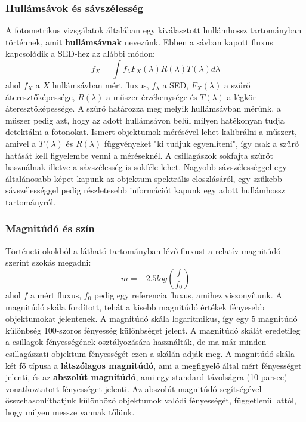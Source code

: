 \documentclass[../main.tex]{subfiles}
\begin{document}
\subsubsection{Hullámsávok és sávszélesség}
A fotometrikus vizsgálatok általában egy kiválasztott hullámhossz tartományban történnek, amit \textbf{hullámsávnak} nevezünk. Ebben a sávban kapott fluxus kapcsolódik a SED-hez az alábbi módon:
\begin{equation}
    f_X = \int f_\lambda F_X(\lambda) R(\lambda) T(\lambda) d\lambda
\end{equation}
ahol $f_X$ a $X$ hullámsávban mért fluxus, $f_\lambda$ a SED, $F_X(\lambda)$ a szűrő áteresztőképessége, $R(\lambda)$ a műszer érzékenysége és $T(\lambda)$ a légkör áteresztőképessége.
A szűrő határozza meg melyik hullámsávban mérünk, a műszer pedig azt, hogy az adott hullámsávon belül milyen hatékonyan tudja detektálni a fotonokat. Ismert objektumok mérésével lehet kalibrálni a műszert,
amivel a $T(\lambda)$ és $R(\lambda)$ függvényeket "ki tudjuk egyenlíteni", így csak a szűrő hatását kell figyelembe venni a méréseknél. A csillagászok sokfajta szűrőt használnak illetve a sávszélesség is sokféle lehet.
Nagyobb sávszélességgel egy általánosabb képet kapunk az objektum spektrális eloszlásáról, egy szűkebb sávszélességgel pedig részletesebb információt kapunk egy adott hullámhossz tartományról.

\subsubsection{Magnitúdó és szín}
Történeti okokból a látható tartományban lévő fluxust a relatív magnitúdó szerint szokás megadni:
\begin{equation}
    m = -2.5 log \left( \frac{f}{f_0} \right)
\end{equation}
ahol $f$ a mért fluxus, $f_0$ pedig egy referencia fluxus, amihez viszonyítunk. A magnitúdó skála fordított, tehát a kisebb magnitúdó értékek fényesebb objektumokat jelentenek. A magnitúdó skála logaritmikus, így egy 5 magnitúdó különbség
100-szoros fényesség különbséget jelent. A magnitúdó skálát eredetileg a csillagok fényességének osztályozására használták, de ma már minden csillagászati objektum fényességét ezen a skálán adják meg. A magnitúdó skála két fő típusa a \textbf{látszólagos magnitúdó},
ami a megfigyelő által mért fényességet jelenti, és az \textbf{abszolút magnitúdó}, ami egy standard távolságra (10 parsec) vonatkoztatott fényességet jelenti. Az abszolút magnitúdó segítségével összehasonlíthatjuk
különböző objektumok valódi fényességét, függetlenül attól, hogy milyen messze vannak tőlünk.
\end{document}
